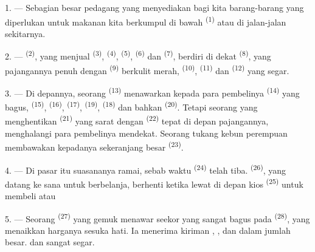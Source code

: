 \VUsaut{4.0mm}
\VUsaut{3.0mm}

\VUsaut{3.0mm}

1. --- Sebagian besar pedagang yang menyediakan bagi kita barang-barang
yang diperlukan untuk makanan kita berkumpul di bawah 
\textsuperscript{(1)}  atau di jalan-jalan
sekitarnya.

2. ---  \textsuperscript{(2)}, yang menjual
 \textsuperscript{(3)}, 
\textsuperscript{(4)},  \textsuperscript{(5)},
 \textsuperscript{(6)} dan 
\textsuperscript{(7)}, berdiri di dekat  \textsuperscript{(8)}, yang pajangannya penuh dengan  \textsuperscript{(9)} berkulit merah, 
\textsuperscript{(10)}, 
\textsuperscript{(11)} dan 
\textsuperscript{(12)} yang segar.

3. --- Di depannya, seorang  \textsuperscript{(13)}
menawarkan kepada para pembelinya  \textsuperscript{(14)}
yang bagus,  \textsuperscript{(15)},
 \textsuperscript{(16)}, 
\textsuperscript{(17)},  \textsuperscript{(19)},
 \textsuperscript{(18)} dan bahkan 
\textsuperscript{(20)}. Tetapi seorang  yang
menghentikan  \textsuperscript{(21)} yang
sarat dengan  \textsuperscript{(22)} tepat di
depan pajangannya, menghalangi para pembelinya mendekat. Seorang
tukang kebun perempuan membawakan kepadanya sekeranjang besar
 \textsuperscript{(23)}.

\VUsaut{4.0mm}
\VUsaut{3.0mm}

4. --- Di pasar itu suasananya ramai, sebab waktu 
\textsuperscript{(24)} telah tiba. 
\textsuperscript{(26)}, yang datang ke sana untuk berbelanja, berhenti
ketika lewat di depan kios  \textsuperscript{(25)}
untuk membeli  atau 

5. --- Seorang  \textsuperscript{(27)} yang gemuk
menawar seekor  yang sangat bagus pada  \textsuperscript{(28)}, yang menaikkan harganya sesuka hati. Ia
menerima kiriman , ,  dan  dalam jumlah besar. 
dan  sangat segar.

